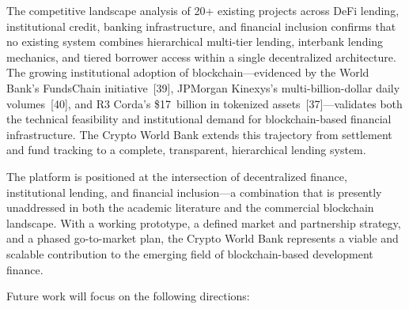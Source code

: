 \documentclass[12pt,a4paper]{report}
\begin{document}
The competitive landscape analysis of 20+ existing projects across DeFi lending, institutional credit, banking infrastructure, and financial inclusion confirms that no existing system combines hierarchical multi-tier lending, interbank lending mechanics, and tiered borrower access within a single decentralized architecture. The growing institutional adoption of blockchain---evidenced by the World Bank's FundsChain initiative~[39], JPMorgan Kinexys's multi-billion-dollar daily volumes~[40], and R3 Corda's \$17~billion in tokenized assets~[37]---validates both the technical feasibility and institutional demand for blockchain-based financial infrastructure. The Crypto World Bank extends this trajectory from settlement and fund tracking to a complete, transparent, hierarchical lending system.

The platform is positioned at the intersection of decentralized finance, institutional lending, and financial inclusion---a combination that is presently unaddressed in both the academic literature and the commercial blockchain landscape. With a working prototype, a defined market and partnership strategy, and a phased go-to-market plan, the Crypto World Bank represents a viable and scalable contribution to the emerging field of blockchain-based development finance.

Future work will focus on the following directions:
\end{document}
